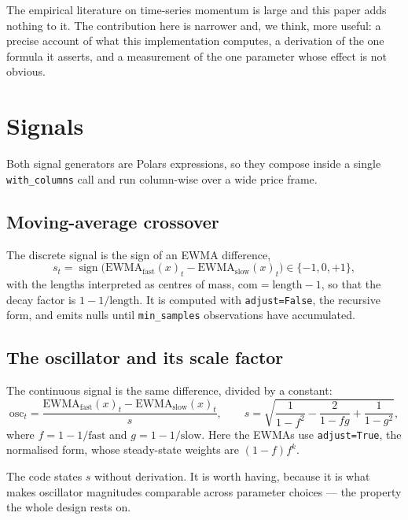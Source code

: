 \documentclass[11pt,a4paper]{article}
\newcommand{\code}[1]{\texttt{#1}}
\DeclareMathOperator{\sign}{sign}
\begin{document}
The empirical literature on time-series momentum is large
\citep{moskowitz2012,hurst2017,baltas2013} and this paper adds nothing to it.
The contribution here is narrower and, we think, more useful: a precise account
of what this implementation computes, a derivation of the one formula it asserts,
and a measurement of the one parameter whose effect is not obvious.

\section{Signals}

Both signal generators are Polars expressions, so they compose inside a single
\code{with\_columns} call and run column-wise over a wide price frame.

\subsection{Moving-average crossover}

The discrete signal is the sign of an EWMA difference,
\begin{equation}
  s_t = \sign\bigl( \mathrm{EWMA}_{\mathrm{fast}}(x)_t - \mathrm{EWMA}_{\mathrm{slow}}(x)_t \bigr)
  \in \{-1, 0, +1\},
\end{equation}
with the lengths interpreted as centres of mass, $\mathrm{com} = \mathrm{length}
- 1$, so that the decay factor is $1 - 1/\mathrm{length}$. It is computed with
\code{adjust=False}, the recursive form, and emits nulls until
\code{min\_samples} observations have accumulated.

\subsection{The oscillator and its scale factor}

The continuous signal is the same difference, divided by a constant:
\begin{equation}
  \mathrm{osc}_t
  = \frac{\mathrm{EWMA}_{\mathrm{fast}}(x)_t - \mathrm{EWMA}_{\mathrm{slow}}(x)_t}{s},
  \qquad
  s = \sqrt{\frac{1}{1-f^2} - \frac{2}{1-fg} + \frac{1}{1-g^2}},
  \label{eq:osc}
\end{equation}
where $f = 1 - 1/\mathrm{fast}$ and $g = 1 - 1/\mathrm{slow}$. Here the EWMAs use
\code{adjust=True}, the normalised form, whose steady-state weights are
$(1-f)f^k$.

The code states $s$ without derivation. It is worth having, because it is what
makes oscillator magnitudes comparable across parameter choices --- the property
the whole design rests on.
\end{document}
